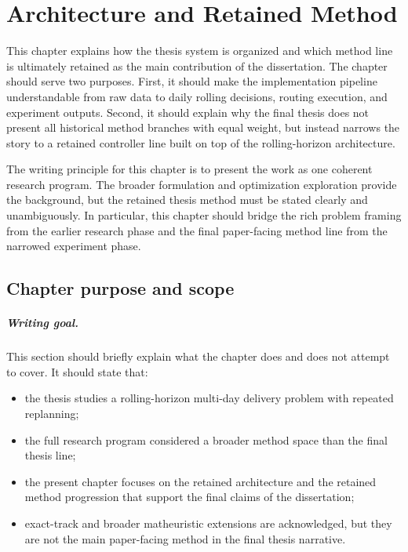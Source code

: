 \chapter{Architecture and Retained Method}
\label{chap:architecture_retained_method}

This chapter explains how the thesis system is organized and which method line is ultimately retained as the main contribution of the dissertation. The chapter should serve two purposes. First, it should make the implementation pipeline understandable from raw data to daily rolling decisions, routing execution, and experiment outputs. Second, it should explain why the final thesis does not present all historical method branches with equal weight, but instead narrows the story to a retained controller line built on top of the rolling-horizon architecture.

The writing principle for this chapter is to present the work as one coherent research program. The broader formulation and optimization exploration provide the background, but the retained thesis method must be stated clearly and unambiguously. In particular, this chapter should bridge the rich problem framing from the earlier research phase and the final paper-facing method line from the narrowed experiment phase.

\section{Chapter purpose and scope}
\label{sec:arch_scope}

\paragraph{Writing goal.}
This section should briefly explain what the chapter does and does not attempt to cover. It should state that:
\begin{itemize}
    \item the thesis studies a rolling-horizon multi-day delivery problem with repeated replanning;
    \item the full research program considered a broader method space than the final thesis line;
    \item the present chapter focuses on the retained architecture and the retained method progression that support the final claims of the dissertation;
    \item exact-track and broader matheuristic extensions are acknowledged, but they are not the main paper-facing method in the final thesis narrative.
\end{itemize}

